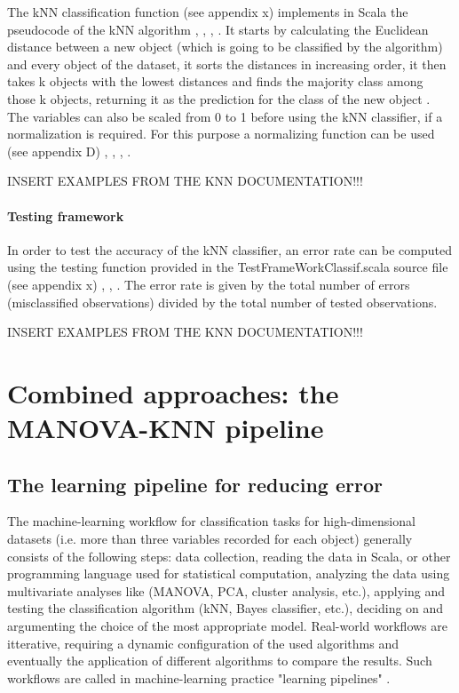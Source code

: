 \documentclass {article}
\begin{document}
The kNN classification function (see appendix x) implements in Scala the pseudocode of the kNN algorithm \cite{harrington_machine_2012}, \cite{odersky_programming_2010}, \cite{swartz_learning_2015}, \cite{noauthor_scala_2003}. 
It starts by calculating the Euclidean distance between a new object (which is going to be classified by the algorithm) and every object of the dataset, it sorts the distances in increasing order, it then takes k objects with the lowest distances and finds the majority class among those k objects, returning it as the prediction for the class of the new object \cite{harrington_machine_2012}.
The variables can also be scaled from 0 to 1 before using the kNN classifier, if a normalization is required. For this purpose a normalizing function can be used (see appendix D) \cite{quinn_experimental_2002}, \cite{harrington_machine_2012}, \cite{odersky_programming_2010}, \cite{noauthor_scala_2003}. 

INSERT EXAMPLES FROM THE KNN DOCUMENTATION!!! 

\paragraph{Testing framework}    

In order to test the accuracy of the kNN classifier, an error rate can be computed using the testing function provided in the TestFrameWorkClassif.scala source file (see appendix x) \cite{harrington_machine_2012}, \cite{odersky_programming_2010}, \cite{noauthor_scala_2003}.
 The error rate is given by the total number of errors (misclassified observations) divided by the total number of tested observations. 

INSERT EXAMPLES FROM THE KNN DOCUMENTATION!!! 

\section {Combined approaches: the MANOVA-KNN pipeline}

\subsection{The learning pipeline for reducing error}

The machine-learning workflow for classification tasks for high-dimensional datasets (i.e. more than three variables recorded for each object) generally consists of the following steps: data collection, reading the data in Scala, or other programming language used for statistical computation, analyzing the data using multivariate analyses like (MANOVA, PCA, cluster analysis, etc.), applying and testing the classification algorithm (kNN, Bayes classifier, etc.), deciding on and argumenting the choice of the most appropriate model. 
 Real-world workflows are itterative, requiring a dynamic configuration of the used algorithms and eventually the application of different algorithms to compare the results.
 Such workflows are called in machine-learning practice "learning pipelines" \cite{karau_learning_2015}.\\
\end{document}
